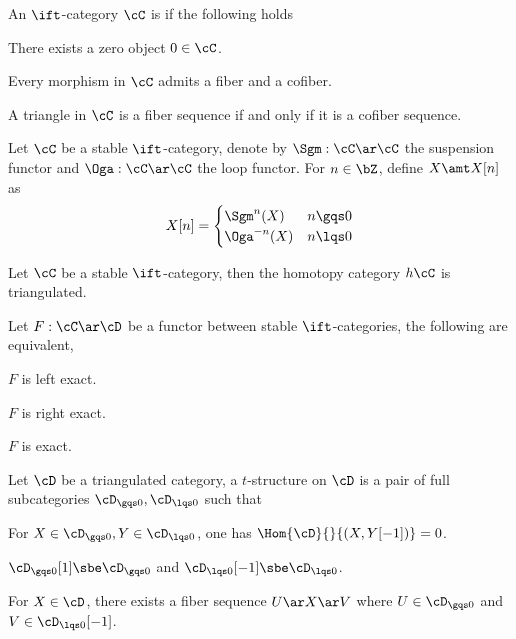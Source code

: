 \documentclass[article, a4paper, twoside]{universal}
\begin{document}
\begin{dfn}[1.1.1.9]
    An $\ift$-category $\cC$ is  if the following holds
    \begin{enr}[label=(\arabic*)]
        \item There exists a zero object $0\in\cC$.
        \item Every morphism in $\cC$ admits a fiber and a cofiber.
        \item A triangle in $\cC$ is a fiber sequence if and only if it is a cofiber sequence.
    \end{enr}

\end{dfn}


\begin{dfn}[1.1.2.7]
    Let $\cC$ be a stable $\ift$-category, denote by $\Sgm:\cC\ar\cC$ the suspension functor and $\Oga:\cC\ar\cC$ the loop functor. For $n\in\bZ$, define $X\amt X[n]$ as
        \[
            X[n]=\begin{cases}
              \Sgm^{n}(X) & n\gqs0 \\
              \Oga^{-n}(X) & n\lqs0
            \end{cases}
        \]
\end{dfn}

\begin{thm}[1.1.2.14]

    Let $\cC$ be a stable $\ift$-category, then the homotopy category $h\cC$ is triangulated.

\end{thm}

\begin{thm}[1.1.4.1]
    Let $F:\cC\ar\cD$ be a functor between stable $\ift$-categories, the following are equivalent,
    \begin{enr}[label=(\arabic*)]
        \item $F$ is left exact.
        \item $F$ is right exact.
        \item $F$ is exact.
    \end{enr}
\end{thm}


\begin{dfn}[1.2.1.1]
    Let $\cD$ be a triangulated category, a $t$-structure on $\cD$ is a pair of full subcategories $\cD_{\gqs0},\cD_{\lqs0}$ such that
    \begin{enr}[label=(\arabic*)]
        \item For $X\in\cD_{\gqs0}, Y\in\cD_{\lqs0}$, one has $\Hom{\cD}{}{(X,Y[-1])}=0$.
        \item $\cD_{\gqs0}[1]\sbe\cD_{\gqs0}$ and $\cD_{\lqs0}[-1]\sbe\cD_{\lqs0}$.
        \item For $X\in\cD$, there exists a fiber sequence $U\ar X\ar V$ where $U\in\cD_{\gqs0}$ and $V\in\cD_{\lqs0}[-1]$.
    \end{enr}
\end{dfn}
\end{document}

